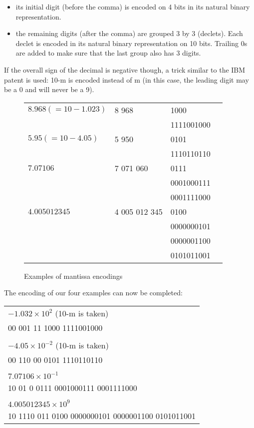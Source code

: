 \documentclass{acm_proc_article-sp}
\begin{document}
\begin{itemize}
\item its initial digit (before the comma) is encoded on 4 bits in its natural binary representation.
\item the remaining digits (after the comma) are grouped 3 by 3 (declets). Each declet is encoded in its natural binary representation on 10 bits. Trailing 0s are added to make sure that the last group also has 3 digits.
\end{itemize}

If the overall sign of the decimal is negative though, a trick similar to the IBM patent is used: 10-m is encoded instead of m (in this case, the leading digit may be a 0 and will never be a 9).

\begin{figure}
\caption{Examples of mantissa encodings}
\label{figure-mantissa-encoding}
\center
\begin{tabular}{|l|l|l|l}
\hline
$8.968 (=10-1.023)$ & 8 968 & 1000 \\
& & 1111001000 \\
\hline
$5.95 (=10-4.05)$ & 5 950 & 0101 \\
& & 1110110110\\
\hline
$7.07106$ & 7 071 060 & 0111 \\
& & 0001000111\\
& & 0001111000\\
\hline
$4.005012345$ & 4 005 012 345 & 0100 \\
& & 0000000101\\
& & 0000001100\\
& & 0101011001\\
\hline
\end{tabular}
\end{figure}

The encoding of our four examples can now be completed:

\begin{tabular}{l}
$- 1.032 \times 10^2$ (10-m is taken)\\
00 001 11 1000 1111001000\\
\\
$-4.05 \times 10^{-2}$ (10-m is taken)\\
00 110 00 0101 1110110110\\
\\
$7.07106 \times 10^{-1}$\\
10 01 0 0111 0001000111 0001111000\\
\\
$4.005012345 \times 10^9$\\
10 1110 011 0100 0000000101 0000001100 0101011001\\
\end{tabular}
\end{document}

